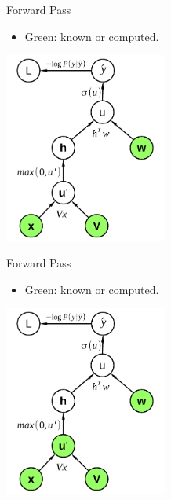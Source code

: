 
\begin{vbframe}{Forward Pass}

\vfill

\begin{itemize}
\item Green: known or computed.
\end{itemize}
\begin{center}
\includegraphics[width = 0.4\textwidth]{./figure/relu_sigmoid_graph_with_loss1}
\end{center}

\vfill

\end{vbframe}



\begin{vbframe}{Forward Pass}

\vfill

\begin{itemize}
\item Green: known or computed.
\end{itemize}
\begin{center}
\includegraphics[width = 0.4\textwidth]{./figure/relu_sigmoid_graph_with_loss2}
\end{center}

\vfill

\end{vbframe}


